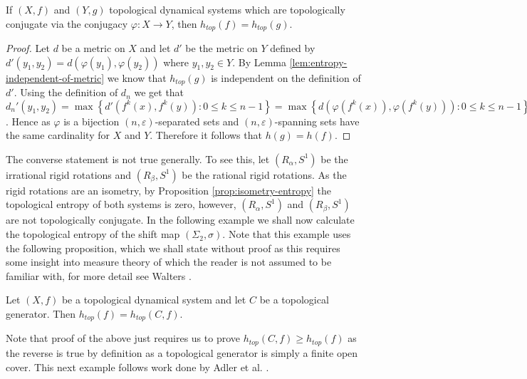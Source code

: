 \begin{prop} \label{prop:conjugacy-preserves-entropy}
    If $(X, f)$ and $(Y, g)$ topological dynamical systems which are topologically conjugate via the conjugacy $\varphi: X \to Y$, then $h_{top}(f) = h_{top}(g)$.
    \begin{proof}
    Let $d$ be a metric on $X$ and let $d'$ be the metric on $Y$ defined by $d'(y_1, y_2) = d(\varphi(y_1), \varphi(y_2))$ where $y_1, y_2 \in Y$. By Lemma \ref{lem:entropy-independent-of-metric} we know that $h_{top}(g)$ is independent on the definition of $d'$. Using the definition of $d_n$ we get that $d_n'(y_1, y_2) = \max{\left\lbrace d'(f^k(x), f^k(y)): 0 \leq k \leq n - 1 \right\rbrace} = \max{\left\lbrace d(\varphi(f^k(x)), \varphi(f^k(y))): 0 \leq k \leq n - 1 \right\rbrace} = \max{\left\lbrace d(f^k(\varphi(x)), f^k(\varphi(y))): 0 \leq k \leq n - 1 \right\rbrace}  = d_n(\varphi(y_1), \varphi(y_2))$. Hence as $\varphi$ is a bijection $(n, \varepsilon)$-separated sets and $(n, \varepsilon)$-spanning sets have the same cardinality for $X$ and $Y$. Therefore it follows that $h(g) = h(f)$.
    \end{proof}
\end{prop}

The converse statement is not true generally. To see this, let $(R_\alpha, S^1)$ be the irrational rigid rotations and $(R_\beta, S^1)$ be the rational rigid rotations. As the rigid rotations are an isometry, by Proposition \ref{prop:isometry-entropy} the topological entropy of both systems is zero, however, $(R_\alpha, S^1)$ and $(R_\beta, S^1)$ are not topologically conjugate. In the following example we shall now calculate the topological entropy of the shift map $(\Sigma_2, \sigma)$. Note that this example uses the following proposition, which we shall state without proof as this requires some insight into measure theory of which the reader is not assumed to be familiar with, for more detail see Walters \cite{walters}.

\begin{prop} \label{prop:entropy-generator}
    Let $(X, f)$ be a topological dynamical system and let $C$ be a topological generator. Then $h_{top}(f) = h_{top}(C, f)$.
\end{prop}

Note that proof of the above just requires us to prove $h_{top}(C, f) \geq h_{top}(f)$ as the reverse is true by definition as a topological generator is simply a finite open cover. This next example follows work done by Adler et al. \cite{adler}.

